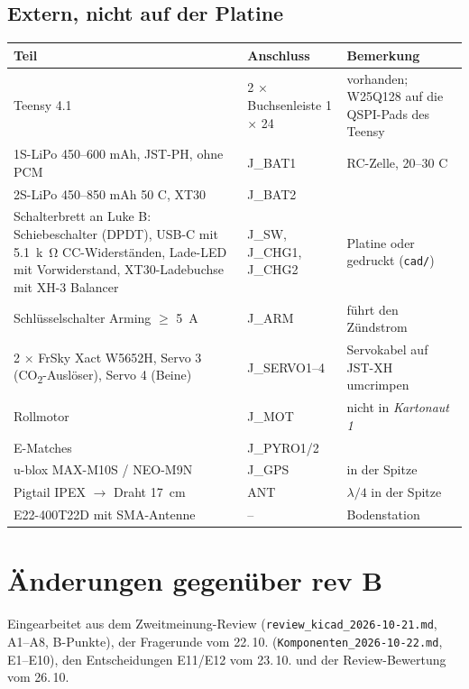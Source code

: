 \documentclass[10pt,a4paper,twoside]{article}
\begin{document}
\subsection*{Extern, nicht auf der Platine}
\begin{tabularx}{\textwidth}{L{70mm} L{30mm} X}
\toprule
\textbf{Teil} & \textbf{Anschluss} & \textbf{Bemerkung}\\
\midrule
Teensy 4.1 & 2 × Buchsenleiste 1 × 24 & vorhanden; W25Q128 auf die QSPI-Pads des Teensy\\
1S-LiPo 450--600 mAh, JST-PH, ohne PCM & J\_BAT1 & RC-Zelle, 20--30 C\\
2S-LiPo 450--850 mAh 50 C, XT30 & J\_BAT2 & \\
Schalterbrett an Luke B: Schiebeschalter (DPDT), USB-C mit \SI{5.1}{k\ohm} CC-Widerständen, Lade-LED mit Vorwiderstand, XT30-Ladebuchse mit XH-3 Balancer & J\_SW, J\_CHG1, J\_CHG2 & Platine oder gedruckt (\texttt{cad/})\\
Schlüsselschalter Arming $\ge$ \SI{5}{A} & J\_ARM & führt den Zündstrom\\
2 × FrSky Xact W5652H, Servo 3 (CO\textsubscript{2}-Auslöser), Servo 4 (Beine) & J\_SERVO1--4 & Servokabel auf JST-XH umcrimpen\\
Rollmotor & J\_MOT & nicht in \emph{Kartonaut 1}\\
E-Matches & J\_PYRO1/2 & \\
u-blox MAX-M10S / NEO-M9N & J\_GPS & in der Spitze\\
Pigtail IPEX $\to$ Draht \SI{17}{cm} & ANT & $\lambda/4$ in der Spitze\\
E22-400T22D mit SMA-Antenne & -- & Bodenstation\\
\bottomrule
\end{tabularx}

\section{Änderungen gegenüber rev B}\label{sec:changes}
Eingearbeitet aus dem Zweitmeinung-Review (\texttt{review\_kicad\_2026-10-21.md}, A1--A8, B-Punkte), der Fragerunde vom 22.\,10. (\texttt{Komponenten\_2026-10-22.md}, E1--E10), den Entscheidungen E11/E12 vom 23.\,10. und der Review-Bewertung vom 26.\,10.
\end{document}
